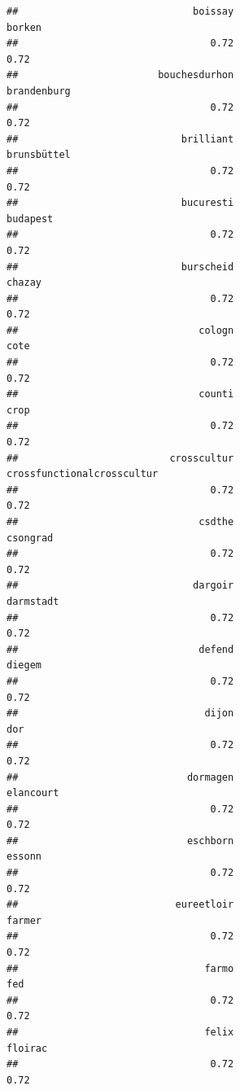 \documentclass[
]{article}
\begin{document}
\begin{verbatim}
##                              boissay                               borken 
##                                 0.72                                 0.72 
##                        bouchesdurhon                          brandenburg 
##                                 0.72                                 0.72 
##                            brilliant                          brunsbüttel 
##                                 0.72                                 0.72 
##                            bucuresti                             budapest 
##                                 0.72                                 0.72 
##                            burscheid                               chazay 
##                                 0.72                                 0.72 
##                               cologn                                 cote 
##                                 0.72                                 0.72 
##                               counti                                 crop 
##                                 0.72                                 0.72 
##                          crosscultur           crossfunctionalcrosscultur 
##                                 0.72                                 0.72 
##                               csdthe                             csongrad 
##                                 0.72                                 0.72 
##                              dargoir                            darmstadt 
##                                 0.72                                 0.72 
##                               defend                               diegem 
##                                 0.72                                 0.72 
##                                dijon                                  dor 
##                                 0.72                                 0.72 
##                             dormagen                            elancourt 
##                                 0.72                                 0.72 
##                             eschborn                               essonn 
##                                 0.72                                 0.72 
##                           eureetloir                               farmer 
##                                 0.72                                 0.72 
##                                farmo                                  fed 
##                                 0.72                                 0.72 
##                                felix                              floirac 
##                                 0.72                                 0.72 

\end{verbatim}
\end{document}
